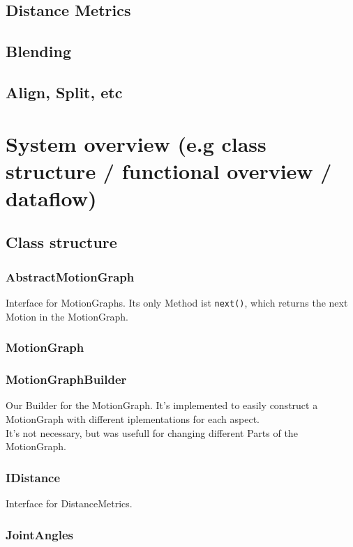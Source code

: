 \documentclass[a4paper,10pt]{scrartcl}
\let\stdsubsection\subsection
\renewcommand\subsection{\nopagebreak\stdsubsection}
\begin{document}
\subsection{Distance Metrics}
\subsection{Blending}
\subsection{Align, Split, etc}

\section{System overview (e.g class structure / functional overview / dataflow)}

\subsection{Class structure}
\subsubsection{AbstractMotionGraph}

Interface for MotionGraphs.
Its only Method ist \lstinline[]{next()}, which returns the next Motion in the MotionGraph.

\subsubsection{MotionGraph}

\subsubsection{MotionGraphBuilder}

Our Builder for the MotionGraph. It's implemented to easily construct a MotionGraph with different iplementations for each aspect.
\\
It's not necessary, but was usefull for changing different Parts of the MotionGraph.

\subsubsection{IDistance}

Interface for DistanceMetrics.

\subsubsection{JointAngles}
\end{document}
